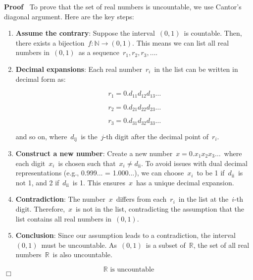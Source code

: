 \documentclass{article}
\newcommand{\tmop}[1]{\ensuremath{\operatorname{#1}}}
\newcommand{\tmstrong}[1]{\textbf{#1}}
\newenvironment{proof}{\noindent\textbf{Proof\ }}{\hspace*{\fill}$\Box$\medskip}
\begin{document}
\begin{proof}
  To prove that the set of real numbers is uncountable, we use Cantor's
  diagonal argument. Here are the key steps:
  \begin{enumerate}
    \item {\tmstrong{Assume the contrary}}: Suppose the interval~$(0, 1)$~is
    countable. Then, there exists a bijection~$f : \mathbb{N} \rightarrow (0,
    1)$. This means we can list all real numbers in~$(0, 1)$~as a
    sequence~$r_1, r_2, r_3, \ldots$.
    
    \item {\tmstrong{Decimal expansions}}: Each real number~$r_i$~in the list
    can be written in decimal form as:
    
    \[ r_1 = 0. d_{11} d_{12} d_{13} \ldots \]
    
    \[ r_2 = 0. d_{21} d_{22} d_{23} \ldots \]
    
    \[ r_3 = 0. d_{31} d_{32} d_{33} \ldots \]
    
    and so on, where~$d_{\tmop{ij}}$~is the~$j$-th digit after the decimal
    point of~$r_i$.
    
    \item {\tmstrong{Construct a new number}}: Create a new number~$x = 0. x_1
    x_2 x_3 \ldots$~where each digit~$x_i$~is chosen such that~$x_i \neq
    d_{\tmop{ii}}$. To avoid issues with dual decimal representations (e.g.,
    0.999... = 1.000...), we can choose~$x_i$~to be 1 if~$d_{\tmop{ii}}$~is
    not 1, and 2 if~$d_{\tmop{ii}}$~is 1. This ensures~$x$~has a unique
    decimal expansion.
    
    \item {\tmstrong{Contradiction}}: The number~$x$~differs from
    each~$r_i$~in the list at the~$i$-th digit. Therefore,~$x$~is not in the
    list, contradicting the assumption that the list contains all real numbers
    in~$(0, 1)$.
    
    \item {\tmstrong{Conclusion}}: Since our assumption leads to a
    contradiction, the interval~$(0, 1)$~must be uncountable. As~$(0, 1)$~is a
    subset of~$\mathbb{R}$, the set of all real numbers~$\mathbb{R}$~is also
    uncountable.
  \end{enumerate}
  \[ \mathbb{R} \text{~is~uncountable} \]
\end{proof}



\

\
\end{document}
